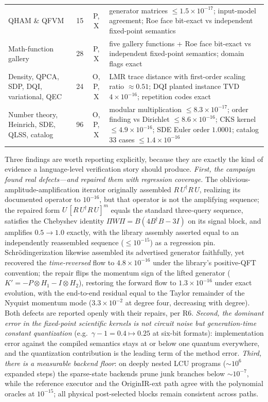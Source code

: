 \begin{table}[t]
\begin{tabular}{@{}p{3.6cm}ccp{8.6cm}@{}}
    QHAM \& QFVM & 15 & P, X & generator matrices $\le 1.5{\times}10^{-17}$; input-model agreement; Roe face bit-exact vs independent fixed-point semantics \\
    Math-function gallery & 28 & P, X & five gallery functions + Roe face bit-exact vs independent fixed-point semantics; domain flags exact \\
    Density, QPCA, SDP, DQI, variational, QEC & 24 & O, P, X & LMR trace distance with first-order scaling ratio $\approx 0.51$; DQI planted instance TVD $4{\times}10^{-16}$; repetition codes exact \\
    Number theory, Heinrich, SDE, QLSS, catalog & 96 & O, P, X & modular multiplication $\le 8.3{\times}10^{-17}$; order finding vs Dirichlet $\le 8.6{\times}10^{-16}$; CKS kernel $\le 4.9{\times}10^{-16}$; SDE Euler order $1.0001$; catalog 33 cases $\le 1.4{\times}10^{-16}$ \\
    \bottomrule
  \end{tabular}
\end{table}

Three findings are worth reporting explicitly, because they are exactly the
kind of evidence a language-level verification story should produce.
\emph{First, the campaign found real defects---and repaired them with
regression coverage.}  The oblivious-amplitude-amplification iterator
originally assembled $R\,U^\dagger R\,U$, realizing its documented operator
to $10^{-16}$, but that operator is not the amplifying sequence; the
repaired form $U\,[R\,U^\dagger R\,U]^{m}$ equals the standard three-query
sequence, satisfies the Chebyshev identity
$\Pi W \Pi = B(4B^\dagger B - 3I)$ on its signal block, and amplifies
$0.5 \to 1.0$ exactly, with the library assembly asserted equal to an
independently reassembled sequence ($\le 10^{-15}$) as a regression pin.
Schr\"odingerization likewise assembled its advertised generator
faithfully, yet recovered the \emph{time-reversed} flow to
$4.8{\times}10^{-16}$ under the library's positive-QFT convention; the
repair flips the momentum sign of the lifted generator
($K' = -P\otimes H_1 - I\otimes H_2$), restoring the forward flow to
$1.3{\times}10^{-16}$ under exact evolution, with the end-to-end residual
equal to the Taylor remainder of the Nyquist momentum mode
($3.3{\times}10^{-2}$ at degree four, decreasing with degree).  Both
defects are reported openly with their repairs, per R6.
\emph{Second, the dominant error in the fixed-point scientific kernels is
not circuit noise but generation-time constant quantization} (e.g.\
$\gamma - 1 = 0.4 \mapsto 0.25$ at six-bit formats): implementation error
against the compiled semantics stays at or below one quantum everywhere,
and the quantization contribution is the leading term of the method error.
\emph{Third, there is a measurable backend floor}: on deeply nested LCU
programs ($\sim 10^6$ expanded steps) the sparse-state backends prune junk
branches below $\sim 10^{-7}$, while the reference executor and the
OriginIR-ext path agree with the polynomial oracles at $10^{-15}$; all
physical post-selected blocks remain consistent across paths.

